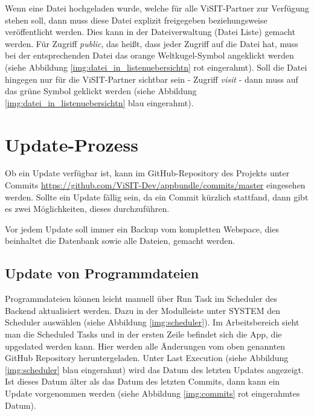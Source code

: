 Wenn eine Datei hochgeladen wurde, welche für alle ViSIT-Partner zur Verfügung stehen soll, dann muss diese Datei explizit freigegeben beziehungsweise veröffentlicht werden. Dies kann in der Dateiverwaltung (Datei Liste) gemacht werden. 
Für Zugriff \textit{public}, das heißt, dass jeder Zugriff auf die Datei hat, muss bei der entsprechenden Datei das orange Weltkugel-Symbol angeklickt werden (siehe Abbildung \ref{img:datei_in_listenuebersichtn} rot eingerahmt).
Soll die Datei hingegen nur für die ViSIT-Partner sichtbar sein - Zugriff \textit{visit} - dann muss auf das grüne Symbol geklickt werden (siehe Abbildung \ref{img:datei_in_listenuebersichtn} blau eingerahmt).










\cleardoublepage

\section{Update-Prozess}

Ob ein Update verfügbar ist, kann im GitHub-Repository des Projekts unter Commits \url{https://github.com/ViSIT-Dev/appbundle/commits/master} eingesehen werden. Sollte ein Update fällig sein, da ein Commit kürzlich stattfand, dann gibt es zwei Möglichkeiten, dieses durchzuführen.

Vor jedem Update soll immer ein Backup vom kompletten Webspace, dies beinhaltet die Datenbank sowie alle Dateien, gemacht werden.


\subsection{Update von Programmdateien}

Programmdateien können leicht manuell über \glqq Run Task\grqq{} im Scheduler des Backend aktualisiert werden.
Dazu in der Modulleiste unter SYSTEM den \glqq Scheduler\grqq{} auswählen  (siehe Abbildung \ref{img:scheduler}). Im Arbeitsbereich sieht man die \glqq Scheduled Tasks\grqq{} und in der ersten Zeile befindet sich die App, die upgedated werden kann. Hier werden alle Änderungen vom oben genannten GitHub Repository heruntergeladen. Unter \glqq Last Execution\grqq{} (siehe Abbildung \ref{img:scheduler} blau eingerahmt) wird das Datum des letzten Updates angezeigt. Ist dieses Datum älter als das Datum des letzten Commits, dann kann ein Update vorgenommen werden (siehe Abbildung \ref{img:commits} rot eingerahmtes Datum).

